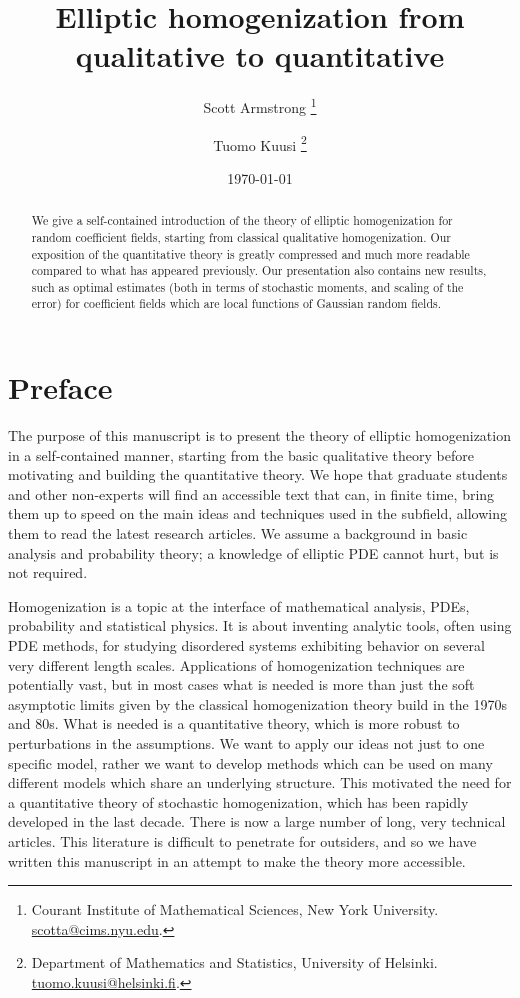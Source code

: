 \documentclass[11pt]{article} %
\title{\bf \Large Elliptic homogenization from qualitative to quantitative}
\author{Scott Armstrong
\thanks{Courant Institute of Mathematical Sciences, New York University.
{\footnotesize \href{mailto:scotta@cims.nyu.edu}{scotta@cims.nyu.edu}.}
}
\and 
Tuomo Kuusi
\thanks{Department of Mathematics and Statistics, University of Helsinki.
{\footnotesize \href{mailto:tuomo.kuusi@helsinki.fi}{tuomo.kuusi@helsinki.fi}.}
}
}
\date{\today}
\numberwithin{equation}{section}
\theoremstyle{definition}
\begin{document}
\maketitle

\begin{abstract}
We give a self-contained introduction of the theory of elliptic homogenization for random coefficient fields, starting from classical qualitative homogenization. Our exposition of the quantitative theory is greatly compressed and much more readable compared to what has appeared previously. 
Our presentation also contains new results, such as optimal estimates (both in terms of stochastic moments, and scaling of the error) for coefficient fields which are local functions of Gaussian random fields.  
\end{abstract}

\setcounter{tocdepth}{2}  
\tableofcontents

\setcounter{section}{-1}  



\section{Preface}
  
The purpose of this manuscript is to present the theory of elliptic homogenization in a self-contained manner, starting from the basic qualitative theory before motivating and building the quantitative theory. We hope that graduate students and other non-experts will find an accessible text that can, in finite time, bring them up to speed on the main ideas and techniques used in the subfield, allowing them to read the latest research articles. We assume a background in basic analysis and probability theory; a knowledge of elliptic PDE cannot hurt, but is not required. 

\smallskip

Homogenization is a topic at the interface of mathematical analysis, PDEs, probability and statistical physics. It is about inventing analytic tools, often using PDE methods, for studying disordered systems exhibiting behavior on several very different length scales.
Applications of homogenization techniques are potentially vast, but in most cases what is needed is more than just the soft asymptotic limits given by the classical homogenization theory build in the 1970s and 80s. What is needed is a quantitative theory, which is more robust to perturbations in the assumptions. We want to apply our ideas not just to one specific model, rather we want to develop methods which can be used on many different models which share an underlying structure. 
This motivated the need for a quantitative theory of stochastic homogenization, which has been rapidly developed in the last decade. There is now a large number of long, very technical articles. This literature is difficult to penetrate for outsiders, and so we have written this manuscript in an attempt to make the theory more accessible.
 
\end{document}
